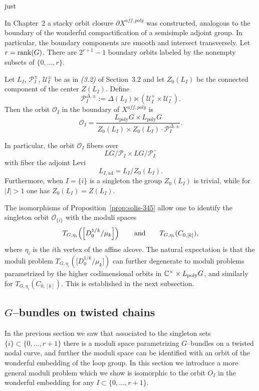 just \documentclass[12pt]{article}
\begin{document}
In Chapter~2 a stacky orbit closure $\partial X^{aff,poly}$ was constructed,
analogous to the boundary of the wonderful compactification of a semisimple
adjoint group.  In particular, the boundary components are smooth and intersect
transversely.  Let $r=\operatorname{rank}(G)$.  There are $2^{r+1}-1$ boundary orbits
labeled by the nonempty subsets of $\{0,\dots,r\}$.

\begin{proposition}
\label{prop:solis-346}
Let $L_I$, $\mathcal P_I^{\pm}$, $\mathcal U_I^{\pm}$ be as in \emph{(3.2)} of
Section~3.2 and let $Z_0(L_I)$ be the connected component of the center
$Z(L_I)$.  Define
\[
\mathcal P_I^{\Delta,\pm}
:= \Delta(L_I)\ltimes (\mathcal U_I^+\times \mathcal U_I^-).
\]
Then the orbit $\mathcal O_I$ in the boundary of $X^{aff,poly}$ is
\[
\mathcal O_I
=
\frac{L_{\mathrm{poly}}G\times L_{\mathrm{poly}}G}
     {\,Z_0(L_I)\times Z_0(L_I)\cdot \mathcal P_I^{\Delta,\pm}}.
\]

In particular, the orbit $\mathcal O_I$ fibers over
\[
LG/\mathcal P_I \times LG/\mathcal P_I^{-}
\]
with fiber the adjoint Levi
\[
L_{I,\mathrm{ad}} = L_I/Z_0(L_I).
\]
Furthermore,
when $I=\{i\}$ is a singleton the group $Z_0(L_I)$ is trivial, while for
$|I|>1$ one has $Z_0(L_I)=Z(L_I)$.
\end{proposition}

\begin{remark}
The isomorphisms of Proposition~\ref{prop:solis-345} allow one to identify
the singleton orbit $\mathcal O_{\{i\}}$ with the moduli spaces
\[
T_{G,\eta_i}\!\left(\Bigl[D_0^{1/k}/\mu_k\Bigr]\right)
\qquad\text{and}\qquad
T_{G,\eta_i}(C_{0,[k]}),
\]
where $\eta_i$ is the $i$th vertex of the affine alcove.
The natural expectation is that the moduli problem
$T_{G,\eta_i}\!\left(\bigl[D_0^{1/k}/\mu_k\bigr]\right)$
can further degenerate to moduli problems parametrized by the higher
codimensional orbits in
$\mathbb{C}^\times\times L_{\mathrm{poly}}G$, and similarly for
$T_{G,\eta_i}(C_{0,[k]})$.
This is established in the next subsection.
\end{remark}

\subsection*{$G$--bundles on twisted chains}

In the previous section we saw that associated to the singleton sets
$\{i\}\subset \{0,\dots,r+1\}$ there is a moduli space parametrizing $G$--bundles
on a twisted nodal curve, and further the moduli space can be identified with an
orbit of the wonderful embedding of the loop group.  In this section we
introduce a more general moduli problem which we show is isomorphic to the orbit
$O_I$ in the wonderful embedding for any $I\subset \{0,\dots,r+1\}$.
\end{document}
